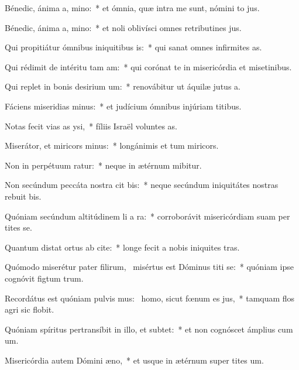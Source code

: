 \item Bénedic, ánima a, mino:~* et ómnia, quæ intra me sunt, nómini to jus.
\item Bénedic, ánima a, mino:~* et noli oblivísci omnes retributines jus.
\item Qui propitiátur ómnibus iniquitibus is:~* qui sanat omnes infirmites as.
\item Qui rédimit de intéritu tam am:~* qui corónat te in misericórdia et misetinibus.
\item Qui replet in bonis desirium um:~* renovábitur ut áquilæ jutus a.
\item Fáciens miseridias minus:~* et judícium ómnibus injúriam titibus.
\item Notas fecit vias as ysi,~* fíliis Israël voluntes as.
\item Miserátor, et miricors minus:~* longánimis et tum miricors.
\item Non in perpétuum ratur:~* neque in ætérnum mibitur.
\item Non secúndum peccáta nostra cit bis:~* neque secúndum iniquitátes nostras rebuit bis.
\item Quóniam secúndum altitúdinem li a ra:~* corroborávit misericórdiam suam per tites se.
\item Quantum distat ortus ab cite:~* longe fecit a nobis iniquites tras.
\item Quómodo miserétur pater filirum,~\pscross{} misértus est Dóminus titi se:~* quóniam ipse cognóvit figtum trum.
\item Recordátus est quóniam pulvis mus:~\pscross{} homo, sicut fœnum es jus,~* tamquam flos agri sic flobit.
\item Quóniam spíritus pertransíbit in illo, et  subtet:~* et non cognóscet ámplius cum um.
\item Misericórdia autem Dómini  æno,~* et usque in ætérnum super tites um.
